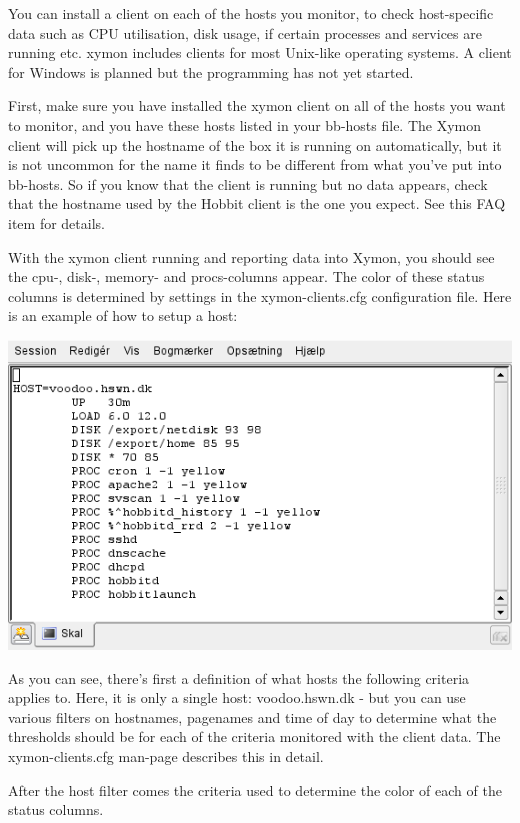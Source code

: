  You can install a client on each of the hosts you monitor, to check host-specific data such as CPU utilisation, disk usage, if certain processes and services are running etc. xymon includes clients for most Unix-like operating systems. A client for Windows is planned but the programming has not yet started.


 First, make sure you have installed the xymon client on all of the hosts you want to monitor, and you have these hosts listed in your bb-hosts file. The Xymon client will pick up the hostname of the box it is running on automatically, but it is not uncommon for the name it finds to be different from what you've put into bb-hosts. So if you know that the client is running but no data appears, check that the hostname used by the Hobbit client is the one you expect. See this FAQ item for details.


 With the xymon client running and reporting data into Xymon, you should see the cpu-, disk-, memory- and procs-columns appear. The color of these status columns is determined by settings in the  xymon-clients.cfg configuration file. Here is an example of how to setup a host:


 \includegraphics[scale=0.5]{./xymon-clients.png} 


 As you can see, there's first a definition of what hosts the following criteria applies to. Here, it is only a single host: voodoo.hswn.dk - but you can use various filters on hostnames, pagenames and time of day to determine what the thresholds should be for each of the criteria monitored with the client data. The xymon-clients.cfg man-page describes this in detail.


 After the host filter comes the criteria used to determine the color of each of the status columns.


